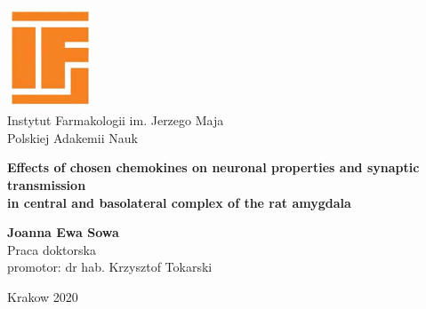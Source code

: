 
\begin{titlepage}
\thispagestyle{empty}\enlargethispage{\the\footskip}%
\begin{center}


\includegraphics[width=0.19\textwidth]{ifpan.jpg}\\[2pt]
{Instytut Farmakologii im. Jerzego Maja \\Polskiej Adakemii Nauk}\\[5pt]

\vspace{3cm}

 {\huge\bfseries Effects of chosen chemokines on neuronal properties and synaptic transmission  \\ in central and basolateral complex of the rat amygdala\\}

 \vspace{1.5cm}
 {\Large\bfseries Joanna Ewa Sowa}\\[5pt]

 \vspace{2cm}
{Praca doktorska} \\[5pt]

{promotor: dr hab. Krzysztof Tokarski} \\[5pt]


 \vfill



 \vfill
{Krakow 2020}


\thispagestyle{empty}



% 
% 





\end{center}
\end{titlepage}
